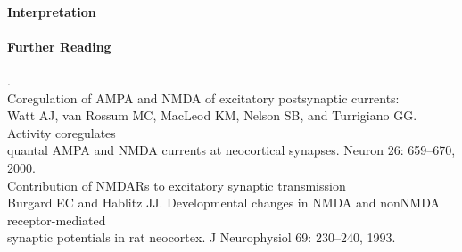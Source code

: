 \documentclass[11pt]{article}
\begin{document}
\paragraph{Interpretation}

\paragraph{Further Reading} \tiny{.}\\
Coregulation of AMPA and NMDA of excitatory postsynaptic currents: \\
\hspace*{0.5in} Watt AJ, van Rossum MC, MacLeod KM, Nelson SB, and Turrigiano GG. Activity coregulates \\
\hspace*{0.5in} quantal AMPA and NMDA currents at neocortical synapses. Neuron 26: 659–670, 2000. \\
Contribution of NMDARs to excitatory synaptic transmission  \\
\hspace*{0.5in} Burgard EC and Hablitz JJ. Developmental changes in NMDA and nonNMDA receptor-mediated \\
\hspace*{0.5in} synaptic potentials in rat neocortex. J Neurophysiol 69: 230–240, 1993. \\
\end{document}
